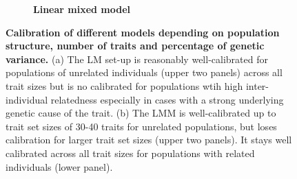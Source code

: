 \begin{figure}[!h]
\begin{subfigure}[b]{0.45\textwidth}
	\caption{\textbf{Linear mixed model}}
 		\label{fig:calibration-lmm}
	\end{subfigure}
	\caption[Calibration of different models depending on population structure, number of traits and percentage of genetic variance]{\textbf{Calibration of different models depending on population structure, number of traits and percentage of genetic variance.} (a) The LM set-up is reasonably well-calibrated for populations of unrelated individuals (upper two panels) across all trait sizes but is no calibrated for populations wtih high inter-individual relatedness especially in cases with a strong underlying genetic cause of the trait. (b) The LMM is well-calibrated up to trait set sizes of 30-40 traits for unrelated populations, but loses calibration for larger trait set sizes (upper two panels). It stays well calibrated across all trait sizes for populations with related individuals (lower panel).}
 	\label{fig:modelchoice}
\end{figure}

